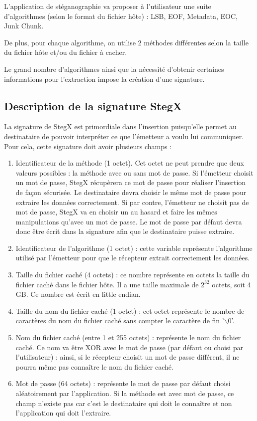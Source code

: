 \documentclass[11pt]{article}
\begin{document}
L'application de stéganographie va proposer à l'utilisateur une suite 
d'algorithmes (selon le format du fichier hôte) : 
LSB, EOF, Metadata, EOC, Junk Chunk. 

De plus, pour chaque algorithme, on utilise 2 méthodes différentes selon 
la taille du fichier hôte et/ou du fichier à cacher. 

Le grand nombre d'algorithmes ainsi que la nécessité d'obtenir certaines 
informations pour l'extraction impose la création d'une signature. 

\subsection{Description de la signature StegX}

La signature de StegX est primordiale dans l'insertion puisqu'elle permet au 
destinataire de pouvoir interpréter ce que l'émetteur a voulu lui communiquer. 
Pour cela, cette signature doit avoir plusieurs champs : 
\begin {enumerate}
\item Identificateur de la méthode (1 octet). Cet octet ne 
peut prendre que deux valeurs possibles : la méthode avec ou sans mot de 
passe. Si l'émetteur choisit un mot de passe, StegX récupèrera ce mot de 
passe pour réaliser l'insertion de façon sécurisée. Le destinataire devra 
choisir le même mot de passe pour extraire les données correctement. 
Si par contre, l'émetteur ne choisit pas de mot de passe, StegX va en choisir 
un au hasard et faire les mêmes manipulations qu'avec un mot de passe. 
Le mot de passe par défaut devra donc être écrit dans la signature afin que 
le destinataire puisse extraire. 
\item Identificateur de l'algorithme (1 octet) : cette variable représente 
l'algorithme utilisé par l'émetteur pour que le récepteur extrait correctement 
les données. 
\item Taille du fichier caché (4 octets) : ce nombre représente en octets 
la taille du fichier caché dans le fichier hôte. Il a une taille maximale 
de $2^{32}$ octets, soit 4 GB. Ce nombre est écrit en little endian. 
\item Taille du nom du fichier caché (1 octet) : cet octet représente le 
nombre de caractères du nom du fichier caché sans compter le caractère de 
fin '$\backslash$0'.
\item Nom du fichier caché (entre 1 et 255 octets) : représente le nom du 
fichier caché. Ce nom va être XOR avec le mot de passe (par défaut ou choisi
par l'utilisateur) : ainsi, si le récepteur choisit un mot de passe différent, 
il ne pourra même pas connaître le nom du fichier caché. 
\item Mot de passe (64 octets) : représente le mot de passe par défaut choisi 
aléatoirement par l'application. Si la méthode est avec mot de passe, 
ce champ n'existe pas car c'est le destinataire qui doit le connaître et 
non l'application qui doit l'extraire. 
\end{enumerate}
\end{document}
